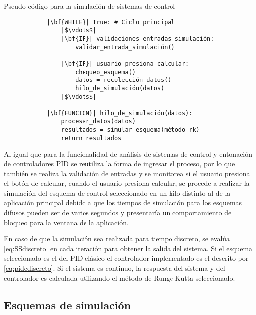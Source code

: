     \begin{longlisting}
        \caption[Pseudo código - Simulación de sistemas de control]{Pseudo código para la simulación de sistemas de control}
        \label{code:simulacion}				
        \begin{verbatim}
            |\bf{WHILE}| True: # Ciclo principal
                |$\vdots$|
                |\bf{IF}| validaciones_entradas_simulación:
                    validar_entrada_simulación()
                
                |\bf{IF}| usuario_presiona_calcular:
                    chequeo_esquema()
                    datos = recolección_datos()
                    hilo_de_simulación(datos)
                |$\vdots$|
            
            |\bf{FUNCION}| hilo_de_simulación(datos):
                procesar_datos(datos)
                resultados = simular_esquema(método_rk)
                return resultados
        \end{verbatim}
    \end{longlisting}

    Al igual que para la funcionalidad de análisis de sistemas de control y entonación de controladores PID se reutiliza la forma de ingresar el proceso, por lo que también se realiza la validación de entradas y se monitorea si el usuario presiona el botón de calcular, cuando el usuario presiona calcular, se procede a realizar la simulación del esquema de control seleccionado en un hilo distinto al de la aplicación principal debido a que los tiempos de simulación para los esquemas difusos pueden ser de varios segundos y presentaría un comportamiento de bloqueo para la ventana de la aplicación.

    En caso de que la simulación sea realizada para tiempo discreto, se evalúa \cref{eq:SSdiscreto} en cada iteración para obtener la salida del sistema. Si el esquema seleccionado es el del PID clásico el controlador implementado es el descrito por \cref{eq:pidcdiscreto}. Si el sistema es continuo, la respuesta del sistema y del controlador es calculada utilizando el método de Runge-Kutta seleccionado.

    \subsection{Esquemas de simulación}

